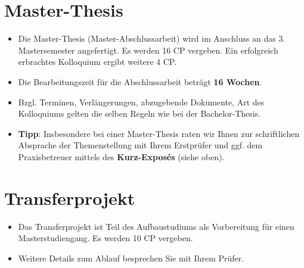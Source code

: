 \section{Master-Thesis}

\begin{itemize}
    \item Die Master-Thesis (Master-Abschlussarbeit) wird im Anschluss an das 3. Mastersemester angefertigt. Es werden 16 CP vergeben. Ein erfolgreich erbrachtes Kolloquium ergibt weitere 4 CP.
    \item Die Bearbeitungszeit für die Abschlussarbeit beträgt \textbf{16 Wochen}.
    \item Bzgl. Terminen, Verlängerungen, abzugebende Dokumente, Art des Kolloquiums gelten die selben Regeln wie bei der Bachelor-Thesis.
    
    \item \textbf{Tipp}: Insbesondere bei einer Master-Thesis raten wir Ihnen zur schriftlichen Absprache der Themenstellung mit Ihrem Erstprüfer und ggf. dem Praxisbetreuer mittels des \textbf{Kurz-Exposés} (siehe oben).
\end{itemize}


\section{Transferprojekt}

\begin{itemize}
    \item Das Transferprojekt ist Teil des Aufbaustudiums als Vorbereitung für einen Masterstudiengang. Es werden 10 CP vergeben.
    \item Weitere Details zum Ablauf besprechen Sie mit Ihrem Prüfer.
\end{itemize}